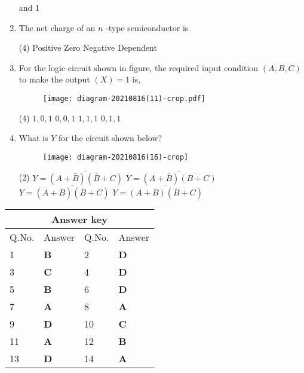 \begin{enumerate}
\begin{tasks}
		 and 1
	\end{tasks}
	\item The net charge of an $n$ -type semiconductor is
{	}
	\begin{tasks}(4)
		\task[\textbf{A.}] Positive
		\task[\textbf{B.}] Zero
		\task[\textbf{C.}] Negative
		\task[\textbf{D.}] Dependent
	\end{tasks}
	\item For the logic circuit shown in figure, the required input condition $(A, B, C)$ to make the output $(X)=1$ is,
{	}
	\begin{figure}[H]
		\centering
		\texttt{[image: diagram-20210816(11)-crop.pdf]}
	\end{figure}
	\begin{tasks}(4)
		\task[\textbf{A.}] $1,0,1$
		\task[\textbf{B.}] $0,0,1$
		\task[\textbf{C.}] $1,1,1$
		\task[\textbf{D.}] $0,1,1$
	\end{tasks}
	\item What is $Y$ for the circuit shown below?
	{}
	\begin{figure}[H]
		\centering
		\texttt{[image: diagram-20210816(16)-crop]}
	\end{figure}
	\begin{tasks}(2)
		\task[\textbf{A.}] $Y=\overline{(A+\bar{B})(\bar{B}+C)}$
		\task[\textbf{B.}]  $Y=\overline{(A+\bar{B})(B+C)}$
		\task[\textbf{C.}] $Y=\overline{(\bar{A}+B)(\bar{B}+C)}$
		\task[\textbf{D.}] $Y=\overline{(A+B)(\bar{B}+C)}$
	\end{tasks}
\end{enumerate}
\setlength\arrayrulewidth{1pt}
\begin{table}[H]
	\centering
	\begin{tabular}{|p{1.5cm}|p{1.5cm}||p{1.5cm}|p{1.5cm}|}
		\hline
		\multicolumn{4}{|c|}{\textbf{Answer key}}\\\hline\hline
		\rowcolor{ocrel}Q.No.&Answer&Q.No.&Answer\\\hline
		1&\textbf{B} &2&\textbf{D}\\\hline 
		3&\textbf{C} &4&\textbf{D} \\\hline
		5&\textbf{B} &6&\textbf{D} \\\hline
		7&\textbf{A}&8&\textbf{A}\\\hline
		9&\textbf{D}&10&\textbf{C}\\\hline
		11&\textbf{A} &12&\textbf{B}\\\hline
		13&\textbf{D}&14&\textbf{A}\\\hline
		
	\end{tabular}
\end{table}
